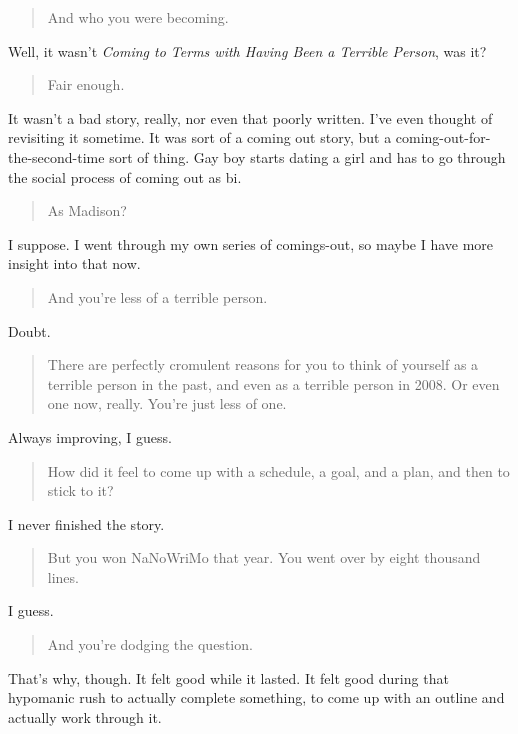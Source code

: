 \begin{quote}
And who you were becoming.
\end{quote}

Well, it wasn't \emph{Coming to Terms with Having Been a Terrible Person}, was it?

\begin{quote}
Fair enough.
\end{quote}

It wasn't a bad story, really, nor even that poorly written. I've even thought of revisiting it sometime. It was sort of a coming out story, but a coming-out-for-the-second-time sort of thing. Gay boy starts dating a girl and has to go through the social process of coming out as bi.

\begin{quote}
As Madison?
\end{quote}

I suppose. I went through my own series of comings-out, so maybe I have more insight into that now.

\begin{quote}
And you're less of a terrible person.
\end{quote}

Doubt.

\begin{quote}
There are perfectly cromulent reasons for you to think of yourself as a terrible person in the past, and even as a terrible person in 2008. Or even one now, really. You're just less of one.
\end{quote}

Always improving, I guess.

\begin{quote}
How did it feel to come up with a schedule, a goal, and a plan, and then to stick to it?
\end{quote}

I never finished the story.

\begin{quote}
But you won NaNoWriMo that year. You went over by eight thousand lines.
\end{quote}

I guess.

\begin{quote}
And you're dodging the question.
\end{quote}

That's why, though. It felt good while it lasted. It felt good during that hypomanic rush to actually complete something, to come up with an outline and actually work through it.

